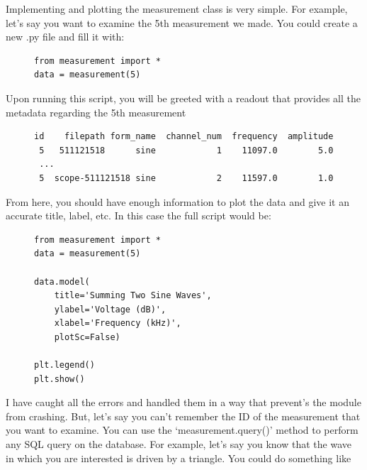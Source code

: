 \documentclass{article}
\begin{document}
Implementing and plotting the measurement class is very simple. For example,
let's say you want to examine the 5th measurement we made. You could create a
new .py file and fill it with:
\begin{figure}[H]
\centering
\begin{minipage}{1\textwidth}
\begin{tcolorbox}
\begin{verbatim}
from measurement import *
data = measurement(5)
\end{verbatim}
\end{tcolorbox}
\end{minipage}
\end{figure}

Upon running this script, you will be greeted with a readout that provides all
the metadata regarding the 5th measurement
\begin{figure}[H]
\centering
\begin{minipage}{1\textwidth}
\begin{tcolorbox}
\begin{verbatim}
id    filepath form_name  channel_num  frequency  amplitude
 5   511121518      sine            1    11097.0        5.0
 ...
 5  scope-511121518 sine            2    11597.0        1.0
\end{verbatim}
\end{tcolorbox}
\end{minipage}
\end{figure}

From here, you should have enough information to plot the data and give it
an accurate title, label, etc. In this case the full script would be:

\begin{figure}[H]
\centering
\begin{minipage}{1\textwidth}
\begin{tcolorbox}
\begin{verbatim}
from measurement import *
data = measurement(5)

data.model(
    title='Summing Two Sine Waves', 
    ylabel='Voltage (dB)', 
    xlabel='Frequency (kHz)', 
    plotSc=False)

plt.legend()
plt.show()
\end{verbatim}
\end{tcolorbox}
\end{minipage}
\end{figure}

I have caught all the errors and handled them in a way that prevent's the
module from crashing. But, let's say you can't remember the ID of the
measurement that you want to examine. You can use the `measurement.query()'
method to perform any SQL query on the database. For example, let's say you
know that the wave in which you are interested is driven by a triangle. You
could do something like
\end{document}
